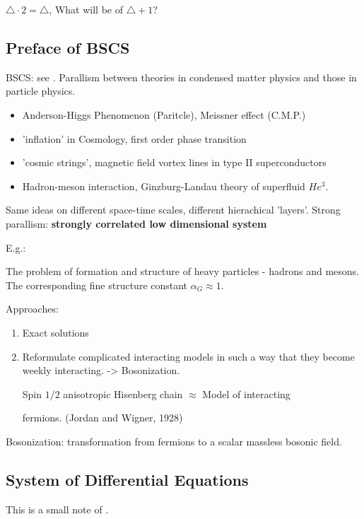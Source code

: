 \documentclass{article}
\numberwithin{equation}{subsection} %
\theoremstyle{definition}
\begin{document}
    $\triangle \cdot 2 = \triangle$, What will be of $\triangle + 1$?

    \subsection{Preface of BSCS}
        \label{sec:Preface_of_Bosonization_and_Strongly 
        Correlated_Systems}
    BSCS: see \cite{BSCS}.
    Parallism between theories in condensed matter physics and those in
    particle physics.
    \begin{itemize}
            \item Anderson-Higgs Phenomenon (Paritcle), Meissner effect
                    (C.M.P.)
            \item 'inflation' in Cosmology, first order phase transition
            \item 'cosmic strings', magnetic field vortex lines in type
                    II superconductors
            \item Hadron-meson interaction, Ginzburg-Landau theory of
                    superfluid $He^3$.
    \end{itemize}
    Same ideas on different space-time scales, different hierachical
    'layers'.
    Strong parallism: \textbf{strongly correlated low dimensional system}

    E.g.:

    The problem of formation and structure of heavy particles - hadrons and mesons. The corresponding fine structure constant $\alpha_G\approx 1$.

    Approaches:
    \begin{enumerate}
            \item Exact solutions
            \item Reformulate complicated interacting models in such a way
                    that they become weekly interacting. -> Bosonization.
                    
                    Spin $1/2$ anisotropic Hisenberg chain $\approx$
                    Model of interacting

                    fermions.
                    (Jordan and Wigner, 1928)
    \end{enumerate}
    Bosonization: transformation from fermions to a scalar massless bosonic
    field.


    \subsection{System of Differential Equations}
    This is a small note of \cite{DETA}.
\end{document}
